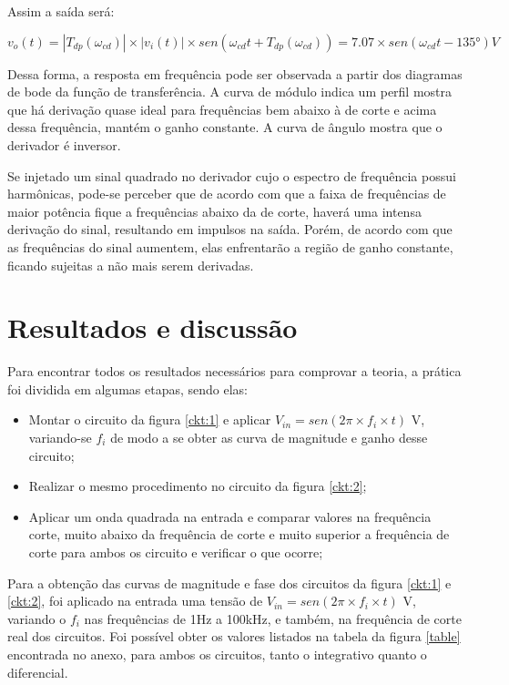 Assim a saída será:

\begin{center}
\begin{equation} \label{der:3}
       v_o(t) = |T_{dp}(\omega_{cd})| \times |v_i(t)| \times sen(\omega_{cd}t + T_{dp}(\omega_{cd})) = 7.07\times sen(\omega_{cd}t - 135°) V
\end{equation}
\end{center}

Dessa forma, a resposta em frequência pode ser observada a partir dos diagramas de bode da função de transferência. A curva de módulo indica um perfil mostra que há derivação quase ideal para frequências bem abaixo à de corte e acima dessa frequência, mantém o ganho constante. A curva de ângulo mostra que o derivador é inversor.



Se injetado um sinal quadrado no derivador cujo o espectro de frequência possui harmônicas, pode-se perceber que de acordo com que a faixa de frequências de maior potência fique a frequências abaixo da de corte, haverá uma intensa derivação do sinal, resultando em impulsos na saída. Porém, de acordo com que as frequências do sinal aumentem, elas enfrentarão a região de ganho constante, ficando sujeitas a não mais serem derivadas.

\section{Resultados e discussão}

Para encontrar todos os resultados necessários para comprovar a teoria, a prática foi dividida em algumas etapas, sendo elas:


\begin{itemize}

    \item Montar o circuito da figura \ref{ckt:1} e aplicar $V_{in} = sen (2\pi \times f_i \times t)$ V, variando-se $f_i$ de modo a se obter as curva de magnitude e ganho desse circuito;
    \item Realizar o mesmo procedimento no circuito da figura \ref{ckt:2};
    \item Aplicar um onda quadrada na entrada e comparar valores na frequência corte, muito abaixo da frequência de corte e muito superior a frequência de corte para ambos os circuito e verificar o que ocorre;
\end{itemize}

Para a obtenção das curvas de magnitude e fase dos circuitos da figura \ref{ckt:1} e \ref{ckt:2}, foi aplicado na entrada uma tensão de $V_{in} = sen (2\pi \times f_i \times t)$ V, variando o $f_{i}$ nas frequências de 1Hz a 100kHz, e também, na frequência de corte real dos circuitos. Foi possível obter os valores listados na tabela da figura \ref{table} encontrada no anexo, para ambos os circuitos, tanto o integrativo quanto o diferencial.

